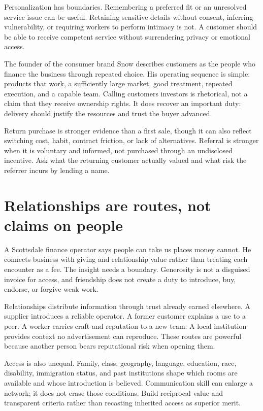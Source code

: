 Personalization has boundaries. Remembering a preferred fit or an unresolved
service issue can be useful. Retaining sensitive details without consent,
inferring vulnerability, or requiring workers to perform intimacy is not. A
customer should be able to receive competent service without surrendering
privacy or emotional access.

The founder of the consumer brand Snow describes customers as the people who
finance the business through repeated choice. His operating sequence is simple:
products that work, a sufficiently large market, good treatment, repeated
execution, and a capable team. Calling customers investors is rhetorical, not
a claim that they receive ownership rights. It does recover an important duty:
delivery should justify the resources and trust the buyer advanced.

Return purchase is stronger evidence than a first sale, though it can also
reflect switching cost, habit, contract friction, or lack of alternatives.
Referral is stronger when it is voluntary and informed, not purchased through
an undisclosed incentive. Ask what the returning customer actually valued and
what risk the referrer incurs by lending a name.

\section{Relationships are routes, not claims on people}

A Scottsdale finance operator says people can take us places money cannot. He
connects business with giving and relationship value rather than treating each
encounter as a fee. The insight needs a boundary. Generosity is not a disguised
invoice for access, and friendship does not create a duty to introduce, buy,
endorse, or forgive weak work.

Relationships distribute information through trust already earned elsewhere.
A supplier introduces a reliable operator. A former customer explains a use to
a peer. A worker carries craft and reputation to a new team. A local institution
provides context no advertisement can reproduce. These routes are powerful
because another person bears reputational risk when opening them.

Access is also unequal. Family, class, geography, language, education, race,
disability, immigration status, and past institutions shape which rooms are
available and whose introduction is believed. Communication skill can enlarge
a network; it does not erase those conditions. Build reciprocal value and
transparent criteria rather than recasting inherited access as superior merit.

